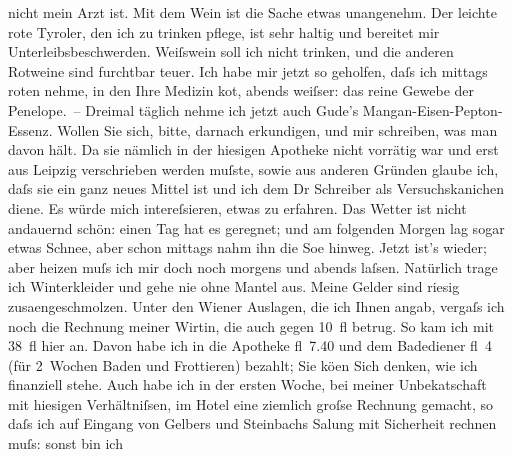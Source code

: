 \begin{ledgroupsized}[t]{13cm}
               nicht mein Arzt ist. Mit dem Wein ist die Sache etwas unangenehm. {\pb}Der leichte rote Tyroler, den ich zu trinken pflege,
               ist sehr \label{K_L00181_1v}\label{K_L00181_1h}haltig und
               bereitet mir Unterleibsbeschwerden. Weiſswein soll ich nicht trinken, und die anderen
               Rotweine sind furchtbar teuer. Ich habe mir jetzt so geholfen, daſs ich mittags roten
               nehme, in den Ihre Medizin ko{\geminationm}t, abends weiſser: das
               reine Gewebe der Penelope. – Dreimal täglich nehme ich jetzt auch Gude’s Mangan-Eisen-Pepton-Essenz. Wollen Sie sich, bitte, darnach
               erkundigen, und mir schreiben, was man davon hält. Da sie nämlich in der hiesigen
               Apotheke nicht vorrätig war und erst aus Leipzig
               verschrieben werden muſste, sowie aus anderen Gründen glaube ich, daſs sie ein ganz
               neues Mittel ist und ich dem Dr Schreiber als
               Versuchskanichen diene. Es würde mich intereſsieren, etwas zu erfahren.\pend
           \pstart
           Das Wetter ist nicht andauernd schön: einen Tag hat es geregnet; und am folgenden
               Morgen lag sogar etwas Schnee, aber schon mittags nahm ihn die So{\geminationn}e hinweg. Jetzt ist’s wieder; aber heizen muſs ich mir
               doch noch morgens und abends laſsen. Natürlich trage ich Winterkleider und gehe nie
               ohne Mantel aus.\pend
           \pstart
           Meine Gelder sind riesig zusa{\geminationm}engeschmolzen. Unter den
                  Wiener Auslagen, die ich Ihnen angab, vergaſs {\pb}ich noch die Rechnung meiner Wirtin, die auch gegen 10 fl betrug. So kam
               ich mit 38 fl hier an. Davon habe ich in die Apotheke fl 7.40 und dem Badediener fl 4
               (für 2 Wochen Baden und Frottieren) bezahlt; Sie kö{\geminationn}en
               Sich denken, wie ich finanziell stehe. Auch habe ich in der ersten Woche, bei meiner
                  Unbeka{\geminationn}tschaft mit hiesigen Verhältniſsen, im Hotel
               eine ziemlich groſse Rechnung gemacht, so daſs ich auf Eingang von Gelbers und Steinbachs Sa{\geminationm}lung mit Sicherheit rechnen muſs: sonst bin ich

\end{ledgroupsized}
